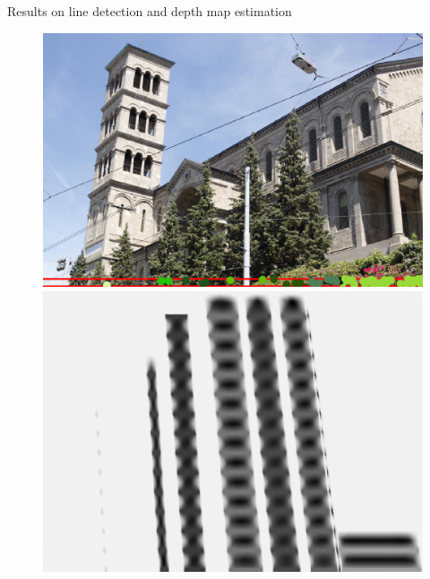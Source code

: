 \begin{frame}{Results on line detection and depth map estimation}
\begin{figure}[!tbp]
  \centering
  \begin{minipage}[b]{0.40\textwidth}
    \includegraphics[width=\textwidth]{../../Diagrams/results/EPIs/673_10_102_4_48_8_strip.png}
  \end{minipage}
	\pause
  \begin{minipage}[b]{0.40\textwidth}
    \includegraphics[width=\textwidth]{../../Diagrams/results/Inpainted/673_10_102_7_48_8_inpainted.png}
  \end{minipage}
\end{figure}
\pause


\end{frame}

